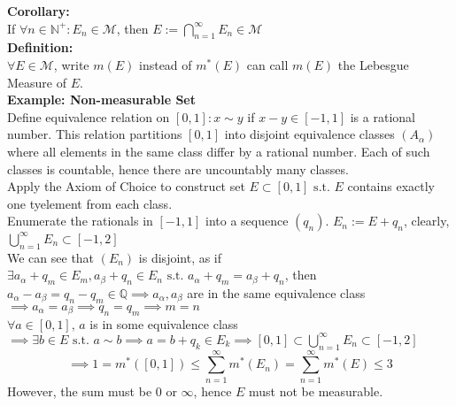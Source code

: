 \documentclass{article}
\newcommand{\N}{\mathbb{N}}
\newcommand{\sumninf}{\displaystyle\sum_{n=1}^\infty}
\newcommand{\capninf}{\displaystyle\bigcap_{n=1}^\infty}
\newcommand{\infcup}{\displaystyle\bigcup_{n=1}^\infty}
\newcommand{\st}{\mbox{ s.t. }}
\newcommand{\0}{{\bf{0}}}
\newcommand{\1}{{\bf{1}}}
\begin{document}
\textbf{Corollary:}\\
If $\forall n\in\N^+:E_n\in\mathcal{M}$, then $E:=\capninf E_n\in\mathcal{M}$\\
\textbf{Definition:}\\
$\forall E\in\mathcal{M}$, write $m(E)$ instead of $m^*(E)$ can call $m(E)$ the Lebesgue Measure of $E$.\\
\textbf{Example: Non-measurable Set}\\
Define equivalence relation on $[0,1]:x\sim y$ if $x-y\in[-1,1]$ is a rational number. This relation partitions $[0,1]$ into disjoint equivalence classes $(A_\alpha)$ where all elements in the same class differ by a rational number. Each of such classes is countable, hence there are uncountably many classes.\\
Apply the Axiom of Choice to construct set $E\subset[0,1]\st E$ contains exactly one tyelement from each class.\\
Enumerate the rationals in $[-1,1]$ into a sequence $(q_n)$. $E_n:=E+q_n$, clearly, $\infcup E_n\subset[-1,2]$\\
We can see that $(E_n)$ is disjoint, as if $\exists a_\alpha+q_m\in E_m,a_\beta+q_n\in E_n\st a_\alpha+q_m=a_\beta+q_n$, then $a_\alpha-a_\beta=q_n-q_m\in\mathbb{Q}\implies a_\alpha,a_\beta$ are in the same equivalence class$\implies a_\alpha=a_\beta\implies q_n=q_m\implies m=n$\\
$\forall a\in[0,1],\,a$ is in some equivalence class$\implies\exists b\in E\st a\sim b\implies a=b+q_k\in E_k\implies [0,1]\subset\infcup E_n\subset[-1,2]$
$$\implies1=m^*([0,1])\le\sumninf m^*(E_n)=\sumninf m^*(E)\le3$$
However, the sum must be $0$ or $\infty$, hence $E$ must not be measurable.
\end{document}
